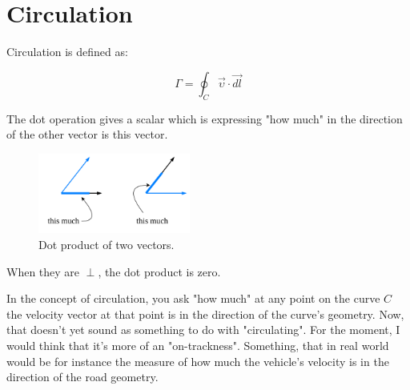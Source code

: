 \documentclass[8pt, twocolumn]{extarticle}
\begin{document}
\setlength{\parskip}{0.6em}
\setlength{\parindent}{0cm}






\section{Circulation}

Circulation is defined as:

\begin{equation}
\Gamma = \oint_C \vec{\upsilon} \cdot \vec{dl}
\end{equation}

The dot operation gives a scalar which is expressing "how much" in the direction of the other vector is this vector.

\begin{figure}[H]
\centering\includegraphics[width=5cm]{circulation_dot_prod}
\caption{Dot product of two vectors.}			
\label{fig:learning_curve}
\end{figure}

When they are $\perp$, the dot product is zero.

In the concept of circulation, you ask "how much" at any point on the curve $C$ the velocity vector at that point is in the direction of the curve's geometry. Now, that doesn't yet sound as something to do with "circulating". For the moment, I would think that it's more of an "on-trackness". Something, that in real world would be for instance the measure of how much the vehicle's velocity is in the direction of the road geometry.
\end{document}
